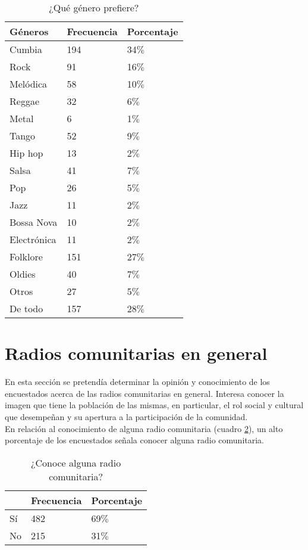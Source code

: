 \begin{table}[ht]
	\centering
{}
		\begin{tabular}{|l|l|l|}\hline
	\textbf{Géneros}&\textbf{Frecuencia}&\textbf{Porcentaje}\\\hline\hline
			Cumbia	&	194&	34$\%$\\\hline
			Rock	&	91&	16$\%$\\\hline
			Melódica	&	58&	10$\%$\\\hline
			Reggae&	32&	6$\%$\\\hline
			Metal	&	6&	1$\%$\\\hline
			Tango	&	52&	9$\%$\\\hline
			Hip hop	&	13&	2$\%$\\\hline
			Salsa	&	41&	7$\%$\\\hline
			Pop	&	26&	5$\%$\\\hline
			Jazz	&	11&	2$\%$\\\hline
			Bossa Nova	&	10&	2$\%$\\\hline
			Electrónica &	11&	2$\%$\\\hline
			Folklore &	151&	27$\%$\\\hline
			Oldies &	40&	7$\%$\\\hline
			Otros &	27&	5$\%$\\\hline
			De todo	&	157&	28$\%$\\\hline
		\end{tabular}
	  \caption{¿Qué género prefiere?}
	  \label{LesGenresTabla}
\end{table}

\newpage

\section{Radios comunitarias en general}
\indent En esta sección se pretendía determinar la opini\'on y conocimiento de los encuestados acerca de las radios comunitarias en general. Interesa conocer la imagen que tiene la poblaci\'on de las mismas, en particular, el rol social y cultural que desempe\~nan y su apertura a la participaci\'on de la comunidad.\\

\indent En relación al conocimiento de alguna radio comunitaria (cuadro \ref{ConoceTabla}), un alto porcentaje de los encuestados señala conocer alguna radio comunitaria.\\
\begin{table}[ht]
	\centering
{}
		\begin{tabular}{|l|l|l|}\hline
	\textbf{}&\textbf{Frecuencia}&\textbf{Porcentaje}\\\hline\hline
			Sí	&	482&	69$\%$\\\hline
			No	&	215&	31$\%$\\\hline
		\end{tabular}
	  \caption{¿Conoce alguna radio comunitaria?}
	  \label{ConoceTabla}
\end{table}

